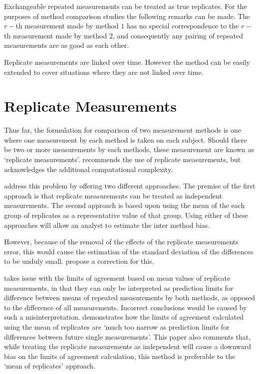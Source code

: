 \documentclass[12pt, a4paper]{report}
\theoremstyle{plain}
\theoremstyle{definition}
\theoremstyle{remark}
\begin{document}
	Exchangeable repeated measurements can be treated as true replicates. For the purposes of method comparison studies the following remarks can be made. The $r-$th measurement made by method $1$ has no special correspondence to the $r-$th measurement made by method $2$, and consequently any pairing of repeated measurements are as good as each other.
	
	

	
	Replicate measurements are linked over time. However the method can be easily extended to cover situations where they are not linked over time.
	
		
	
	
	\section{Replicate Measurements}
	
	Thus far, the formulation for comparison of two measurement
	methods is one where one measurement by each method is taken on
	each subject. Should there be two or more measurements by each
	methods, these measurement are known as `replicate measurements'.
	\citet{BXC2008} recommends the use of replicate measurements, but
	acknowledges the additional computational complexity.
	
	\citet*{BA86} address this problem by offering two different
	approaches. The premise of the first approach is that replicate
	measurements can be treated as independent measurements. The
	second approach is based upon using the mean of the each group of
	replicates as a representative value of that group. Using either
	of these approaches will allow an analyst to estimate the inter
	method bias.
	
	
	However, because of the removal of the effects of the replicate
	measurements error, this would cause the estimation of the
	standard deviation of the differences to be unduly small.
	\citet*{BA86} propose a correction for this.
	
	\citet{BXC2008} takes issue with the limits of agreement based on
	mean values of replicate measurements, in that they can only be interpreted as prediction
	limits for difference between means of repeated measurements by
	both methods, as opposed to the difference of all measurements.
	Incorrect conclusions would be caused by such a misinterpretation.
	\citet{BXC2008} demonstrates how the limits of agreement
	calculated using the mean of replicates are `much too narrow as
	prediction limits for differences between future single
	measurements'. This paper also comments that, while treating the
	replicate measurements as independent will cause a downward bias
	on the limits of agreement calculation, this method is preferable
	to the `mean of replicates' approach.
	
\end{document}
